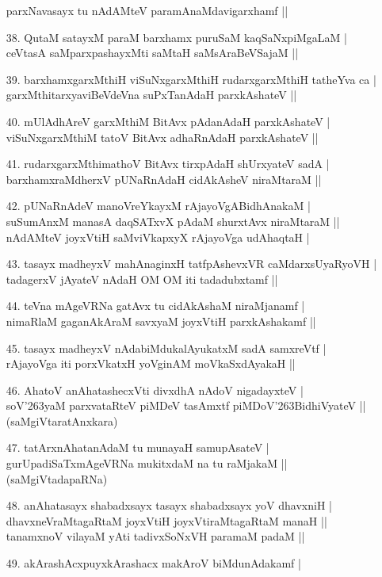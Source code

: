 \begin{itemize}
parxNavasayx tu nAdAMteV paramAnaMdavigarxhamf ||
\item[38.] QutaM satayxM paraM barxhamx puruSaM kaqSaNxpiMgaLaM |\\\label{150}
ceVtasA saMparxpashayxMti saMtaH saMsAraBeVSajaM ||
\item[39.] barxhamxgarxMthiH viSuNxgarxMthiH rudarxgarxMthiH tatheYva ca |\\\label{150}
garxMthitarxyaviBeVdeVna suPxTanAdaH parxkAshateV ||
\item[40.] mUlAdhAreV garxMthiM BitAvx pAdanAdaH parxkAshateV |\\
viSuNxgarxMthiM tatoV BitAvx adhaRnAdaH parxkAshateV ||
\item[41.] rudarxgarxMthimathoV BitAvx tirxpAdaH shUrxyateV sadA |\\
barxhamxraMdherxV pUNaRnAdaH cidAkAsheV niraMtaraM ||
\item[42.] pUNaRnAdeV manoVreYkayxM rAjayoVgABidhAnakaM |\\
suSumAnxM manasA daqSATxvX pAdaM shurxtAvx niraMtaraM ||\\
nAdAMteV joyxVtiH saMviVkapxyX rAjayoVga udAhaqtaH |
\item[43.] tasayx madheyxV mahAnaginxH tatfpAshevxVR caMdarxsUyaRyoVH |\\\label{150}
tadagerxV jAyateV nAdaH OM OM iti tadadubxtamf ||
\item[44.] teVna mAgeVRNa gatAvx tu cidAkAshaM niraMjanamf |\\
nimaRlaM gaganAkAraM savxyaM joyxVtiH parxkAshakamf ||
\item[45.] tasayx madheyxV nAdabiMdukalAyukatxM sadA samxreVtf |\\
rAjayoVga iti porxVkatxH yoVginAM moVkaSxdAyakaH ||
\item[46.] AhatoV anAhatashecxVti divxdhA nAdoV nigadayxteV |\\\label{150}
soV\char'263yaM parxvataRteV piMDeV tasAmxtf piMDoV\char'263BidhiVyateV ||
\hfill{(saMgiVtaratAnxkara)} 
\item[47.] tatArxnAhatanAdaM tu munayaH samupAsateV |\\\label{151}
gurUpadiSaTxmAgeVRNa mukitxdaM na tu raMjakaM ||
\hfill{(saMgiVtadapaRNa)}
\item[48.] anAhatasayx shabadxsayx tasayx shabadxsayx yoV dhavxniH |\\\label{151}
dhavxneVraMtagaRtaM joyxVtiH joyxVtiraMtagaRtaM manaH ||\\
tanamxnoV vilayaM yAti tadivxSoNxVH paramaM padaM ||
\item[49.] akArashAcxpuyxkArashacx makAroV biMdunAdakamf |\\\label{151}

\end{itemize}
